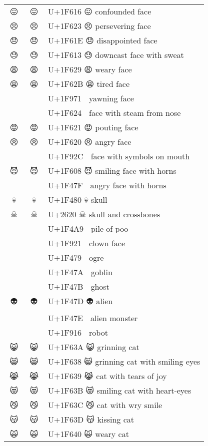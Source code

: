 \documentclass[a4paper,12pt]{ltjarticle}
\newcommand{\fontA}[1]{{\fontspec[RawFeature={mode=harf,+dist,+ccmp}]{Segoe UI Emoji} #1}}
\newcommand{\fontB}[1]{{\fontspec[RawFeature={mode=harf,+dist,+ccmp}]{Noto Color Emoji} #1}}
\begin{document}
\begin{longtable}[c]{ccp{0.8\linewidth}}
\fontA{😖}&\fontB{😖}&U+1F616 😖 confounded face\\
\fontA{😣}&\fontB{😣}&U+1F623 😣 persevering face\\
\fontA{😞}&\fontB{😞}&U+1F61E 😞 disappointed face\\
\fontA{😓}&\fontB{😓}&U+1F613 😓 downcast face with sweat\\
\fontA{😩}&\fontB{😩}&U+1F629 😩 weary face\\
\fontA{😫}&\fontB{😫}&U+1F62B 😫 tired face\\
\fontA{🥱}&\fontB{🥱}&U+1F971 🥱 yawning face\\
\fontA{😤}&\fontB{😤}&U+1F624 😤 face with steam from nose\\
\fontA{😡}&\fontB{😡}&U+1F621 😡 pouting face\\
\fontA{😠}&\fontB{😠}&U+1F620 😠 angry face\\
\fontA{🤬}&\fontB{🤬}&U+1F92C 🤬 face with symbols on mouth\\
\fontA{😈}&\fontB{😈}&U+1F608 😈 smiling face with horns\\
\fontA{👿}&\fontB{👿}&U+1F47F 👿 angry face with horns\\
\fontA{💀}&\fontB{💀}&U+1F480 💀 skull\\
\fontA{☠}&\fontB{☠}&U+2620 ☠ skull and crossbones\\
\fontA{💩}&\fontB{💩}&U+1F4A9 💩 pile of poo\\
\fontA{🤡}&\fontB{🤡}&U+1F921 🤡 clown face\\
\fontA{👹}&\fontB{👹}&U+1F479 👹 ogre\\
\fontA{👺}&\fontB{👺}&U+1F47A 👺 goblin\\
\fontA{👻}&\fontB{👻}&U+1F47B 👻 ghost\\
\fontA{👽}&\fontB{👽}&U+1F47D 👽 alien\\
\fontA{👾}&\fontB{👾}&U+1F47E 👾 alien monster\\
\fontA{🤖}&\fontB{🤖}&U+1F916 🤖 robot\\
\fontA{😺}&\fontB{😺}&U+1F63A 😺 grinning cat\\
\fontA{😸}&\fontB{😸}&U+1F638 😸 grinning cat with smiling eyes\\
\fontA{😹}&\fontB{😹}&U+1F639 😹 cat with tears of joy\\
\fontA{😻}&\fontB{😻}&U+1F63B 😻 smiling cat with heart-eyes\\
\fontA{😼}&\fontB{😼}&U+1F63C 😼 cat with wry smile\\
\fontA{😽}&\fontB{😽}&U+1F63D 😽 kissing cat\\
\fontA{🙀}&\fontB{🙀}&U+1F640 🙀 weary cat\\

\end{longtable}
\end{document}
